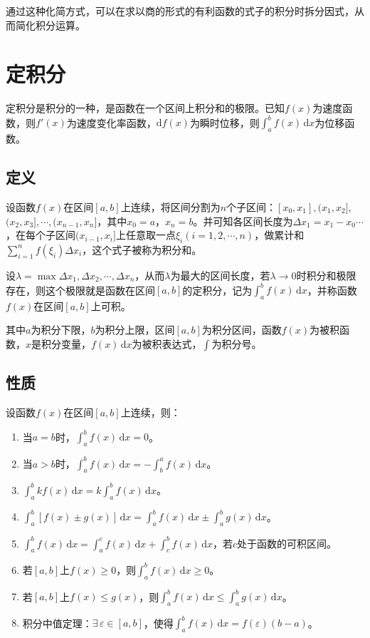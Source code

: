 \documentclass[UTF8, 12pt]{ctexart}
\begin{document}
通过这种化简方式，可以在求以商的形式的有利函数的式子的积分时拆分因式，从而简化积分运算。

\section{定积分}

定积分是积分的一种，是函数在一个区间上积分和的极限。已知$f(x)$为速度函数，则$f'(x)$为速度变化率函数，$\textrm{d}f(x)$为瞬时位移，则$\int_{a}^bf(x)\,\textrm{d}x$为位移函数。

\subsection{定义}

设函数$f(x)$在区间$[a,b]$上连续，将区间分割为$n$个子区间：$[x_0,x_1],(x_1,x_2],$\\$(x_2,x_3],\cdots,(x_{n-1},x_n]$，其中$x_0=a$，$x_n=b$。并可知各区间长度为$\Delta x_1=x_1-x_0\cdots$，在每个子区间$(x_{i-1},x_i]$上任意取一点$\xi_i(i=1,2,\cdots,n)$，做累计和$\sum\limits_{i=1}^nf(\xi_i)\Delta x_i$，这个式子被称为积分和。

设$\lambda=\max{\Delta x_1,\Delta x_2,\cdots,\Delta x_n}$，从而$\lambda$为最大的区间长度，若$\lambda\to 0$时积分和极限存在，则这个极限就是函数在区间$[a,b]$的定积分，记为$\int_a^bf(x)\,\textrm{d}x$，并称函数$f(x)$在区间$[a,b]$上可积。

其中$a$为积分下限，$b$为积分上限，区间$[a,b]$为积分区间，函数$f(x)$为被积函数，$x$是积分变量，$f(x)\,\textrm{d}x$为被积表达式，$\int$为积分号。

\subsection{性质}

设函数$f(x)$在区间$[a,b]$上连续，则：

\begin{enumerate}
    \item 当$a=b$时，$\int_a^bf(x)\,\textrm{d}x=0$。
    \item 当$a>b$时，$\int_a^bf(x)\,\textrm{d}x=-\int_b^af(x)\,\textrm{d}x$。
    \item $\int_a^bkf(x)\,\textrm{d}x=k\int_a^bf(x)\,\textrm{d}x$。
    \item $\int_a^b[f(x)\pm g(x)]\,\textrm{d}x=\int_a^bf(x)\,\textrm{d}x\pm\int_a^bg(x)\,\textrm{d}x$。
    \item $\int_a^bf(x)\,\textrm{d}x=\int_a^cf(x)\,\textrm{d}x+\int_c^bf(x)\,\textrm{d}x$，若$c$处于函数的可积区间。
    \item 若$[a,b]$上$f(x)\geqslant 0$，则$\int_a^bf(x)\,\textrm{d}x\geqslant 0$。
    \item 若$[a,b]$上$f(x)\leqslant g(x)$，则$\int_a^bf(x)\,\textrm{d}x\leqslant\int_a^bg(x)\,\textrm{d}x$。
    \item 积分中值定理：$\exists\,\varepsilon\in[a,b]$，使得$\int_a^bf(x)\,\textrm{d}x=f(\varepsilon)(b-a)$。
\end{enumerate}
\end{document}
